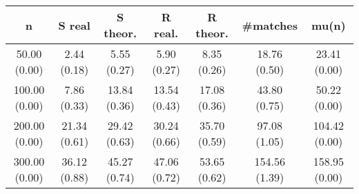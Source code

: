 \begin{center}
\begin{tabular}{c | c | c | c | c | c | c}
n & S real & S theor. & R real. & R theor. & #matches & mu(n)\\ \hline
50.00 (0.00) & 2.44 (0.18) & 5.55 (0.27) & 5.90 (0.27) & 8.35 (0.26) & 18.76 (0.50) & 23.41 (0.00) \\
100.00 (0.00) & 7.86 (0.33) & 13.84 (0.36) & 13.54 (0.43) & 17.08 (0.36) & 43.80 (0.75) & 50.22 (0.00) \\
200.00 (0.00) & 21.34 (0.61) & 29.42 (0.63) & 30.24 (0.66) & 35.70 (0.59) & 97.08 (1.05) & 104.42 (0.00) \\
300.00 (0.00) & 36.12 (0.88) & 45.27 (0.74) & 47.06 (0.72) & 53.65 (0.62) & 154.56 (1.39) & 158.95 (0.00) \\
\end{tabular}
\end{center}
